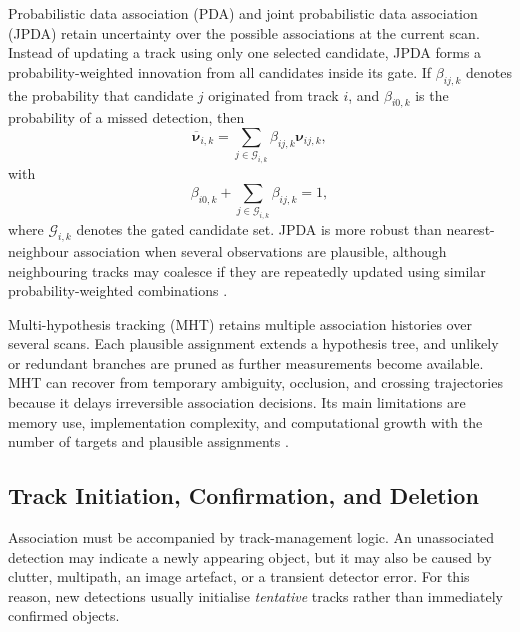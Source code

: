 \documentclass[11pt,oneside,openany]{book}
\begin{document}
Probabilistic data association (PDA) and joint probabilistic data
association (JPDA) retain uncertainty over the possible associations at
the current scan. Instead of updating a track using only one selected
candidate, JPDA forms a probability-weighted innovation from all candidates
inside its gate. If $\beta_{ij,k}$ denotes the probability that candidate
$j$ originated from track $i$, and $\beta_{i0,k}$ is the probability of a
missed detection, then
\begin{equation}
\overline{\boldsymbol{\nu}}_{i,k}=\sum_{j\in\mathcal{G}_{i,k}}\beta_{ij,k}\boldsymbol{\nu}_{ij,k},
\label{eq:jpda-innovation}
\end{equation}
with
\begin{equation}
\beta_{i0,k}+\sum_{j\in\mathcal{G}_{i,k}}\beta_{ij,k}=1,
\label{eq:jpda-probability}
\end{equation}
where $\mathcal{G}_{i,k}$ denotes the gated candidate set. JPDA is more
robust than nearest-neighbour association when several observations are
plausible, although neighbouring tracks may coalesce if they are repeatedly
updated using similar probability-weighted combinations
\cite{barshalom1995multitarget,blackman1999design,
barshalom2011tracking}.

Multi-hypothesis tracking (MHT) retains multiple association histories over
several scans. Each plausible assignment extends a hypothesis tree, and
unlikely or redundant branches are pruned as further measurements become
available. MHT can recover from temporary ambiguity, occlusion, and crossing
trajectories because it delays irreversible association decisions. Its main
limitations are memory use, implementation complexity, and computational
growth with the number of targets and plausible assignments
\cite{reid1979algorithm,blackman1999design,barshalom2011tracking}.

\subsection{Track Initiation, Confirmation, and Deletion}

Association must be accompanied by track-management logic. An unassociated
detection may indicate a newly appearing object, but it may also be caused
by clutter, multipath, an image artefact, or a transient detector error.
For this reason, new detections usually initialise \emph{tentative} tracks
rather than immediately confirmed objects.
\end{document}
